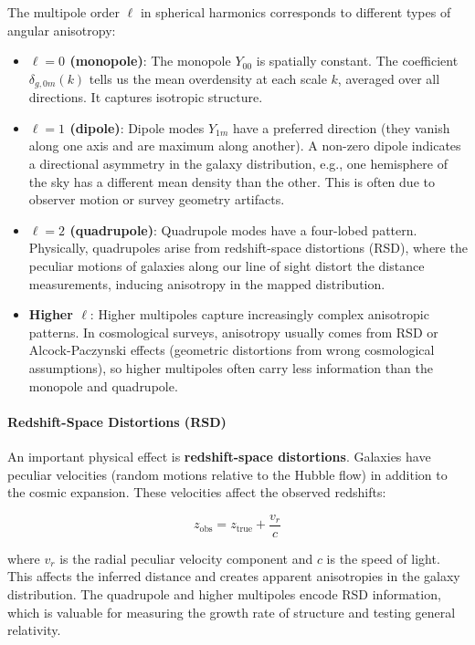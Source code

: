 The multipole order $\ell$ in spherical harmonics corresponds to different types of angular anisotropy:

\begin{itemize}
    \item \textbf{$\ell = 0$ (monopole)}: The monopole $Y_{00}$ is spatially constant. The coefficient $\delta_{g, 0 m}(k)$ tells us the mean overdensity at each scale $k$, averaged over all directions. It captures isotropic structure.
    
    \item \textbf{$\ell = 1$ (dipole)}: Dipole modes $Y_{1m}$ have a preferred direction (they vanish along one axis and are maximum along another). A non-zero dipole indicates a directional asymmetry in the galaxy distribution, e.g., one hemisphere of the sky has a different mean density than the other. This is often due to observer motion or survey geometry artifacts.
    
    \item \textbf{$\ell = 2$ (quadrupole)}: Quadrupole modes have a four-lobed pattern. Physically, quadrupoles arise from redshift-space distortions (RSD), where the peculiar motions of galaxies along our line of sight distort the distance measurements, inducing anisotropy in the mapped distribution.
    
    \item \textbf{Higher $\ell$}: Higher multipoles capture increasingly complex anisotropic patterns. In cosmological surveys, anisotropy usually comes from RSD or Alcock-Paczynski effects (geometric distortions from wrong cosmological assumptions), so higher multipoles often carry less information than the monopole and quadrupole.
\end{itemize}

\paragraph{Redshift-Space Distortions (RSD)}

An important physical effect is \textbf{redshift-space distortions}. Galaxies have peculiar velocities (random motions relative to the Hubble flow) in addition to the cosmic expansion. These velocities affect the observed redshifts:

\begin{equation}
z_{\text{obs}} = z_{\text{true}} + \frac{v_r}{c}
\end{equation}

where $v_r$ is the radial peculiar velocity component and $c$ is the speed of light. This affects the inferred distance and creates apparent anisotropies in the galaxy distribution. The quadrupole and higher multipoles encode RSD information, which is valuable for measuring the growth rate of structure and testing general relativity.

